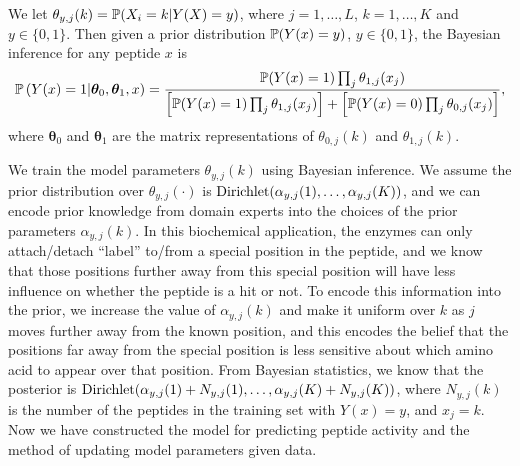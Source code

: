 We let $\theta_{y,j}(k)=\mathbb{P}(X_i=k|Y(X)=y)$, where $j=1,\ldots,L$, $k=1,\ldots,K$ and $y\in\{0,1\}$. Then given a prior distribution $\mathbb{P}(Y(x)=y)$, $y\in\{0,1\}$, the
Bayesian inference for any peptide $x$ is
%
\begin{equation} \label{eq:peptide model}
  \mathbb{P}\left(Y(x) = 1 | \boldsymbol{\theta}_0, \boldsymbol{\theta}_1, x \right) =
  \frac{\mathbb{P}(Y(x)=1) \prod_{j} \theta_{1,j}(x_j)}{
  \left[ \mathbb{P}(Y(x)=1) \prod_{j} \theta_{1,j}(x_j)\right] +
  \left[ \mathbb{P}(Y(x)=0) \prod_{j} \theta_{0,j}(x_j)\right]},
\end{equation}
where $\boldsymbol{\theta}_0$ and $\boldsymbol{\theta}_1$ are the matrix representations of $\theta_{0,j}(k)$ and $\theta_{1,j}(k)$. 

We train the model parameters $\theta_{y,j}(k)$ using Bayesian inference. We assume the prior distribution over $\theta_{y,j}(\cdot)$ is 
$\mathrm{Dirichlet}(\alpha_{y,j}(1),\ldots,\alpha_{y,j}(K))$, and we 
can encode prior knowledge from domain experts into the choices of the prior parameters $\alpha_{y,j}(k)$. In this biochemical application, the enzymes can only
attach/detach ``label'' to/from a special position in the peptide, and we know that those positions further away from this special position will have less
influence on whether the peptide is a hit or not. To encode this information into the prior, we increase the value of $\alpha_{y,j}(k)$ and make it uniform over
$k$ as $j$ moves further away from the known position, and this encodes the belief that the positions far away from the special position is less sensitive about
which amino acid to appear over that position.
%
From Bayesian statistics, we know that the posterior is $\mathrm{Dirichlet}( \alpha_{y,j}(1) + N_{y,j}(1), \ldots, \alpha_{y,j}(K) + N_{y,j}(K))$, where $N_{y,j}(k)$ is the number
of the peptides in the training set with $Y(x)=y$, and $x_j=k$.
%
Now we have constructed the model for predicting peptide activity and the method of updating model parameters given data.

